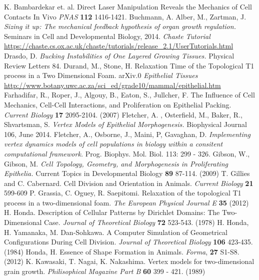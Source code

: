 \begin{thebibliography}{1}
 K. Bambardekar et. al. Direct Laser Manipulation Reveals the Mechanics of Cell Contacts In Vivo \emph{PNAS} \textbf{112} 1416-1421.
 Buchmann, A. Alber, M., Zartman, J. \emph{ Sizing it up: The mechanical feedback hypothesis of organ growth regulation.} Seminars in Cell and Developmental Biology, 2014.
 \emph{Chaste Tutorial} \url{https://chaste.cs.ox.ac.uk/chaste/tutorials/release_2.1/UserTutorials.html}
 Drasdo, D. \emph{Bucking Instabilities of One Layered Growing Tissues.} Physical Review Letters 84.
 Durand, M., Stone, H. Relaxation Time of the Topological T1 process in a Two Dimensional Foam. arXiv.0
\emph{Epithelial Tissues} \url{http://www.botany.uwc.ac.za/sci_ed/grade10/mammal/epithelial.htm}
 Farhadifar, R., Roper, J., Algouy, B., Eaton, S., Jullcher, F. The Influence of Cell Mechanics, Cell-Cell Interactions, and Proliferation on Epithelial Packing. \emph{Current Biology} \textbf{17} 2095-2104. (2007) 
 Fletcher, A. , Osterfield, M., Baker, R., Shvartsman, S. \emph{Vertex Models of Epithelial Morphogenesis.} Biophysical Journal 106, June 2014.
 Fletcher, A., Osborne, J., Maini, P, Gavaghan, D. \emph{Implementing vertex dynamics models of cell populations in biology within a consitent computational framework.} Prog. Biophys. Mol. Biol. 113: 299 - 326.
 Gibson, W., Gibson, M. \emph{Cell Topology, Geometry, and Morphogenesis  in Proliferating Epithelia.} Current Topics in Developmental Biology \textbf{89} 87-114. (2009)
 T. Gillies and C. Cabernard. Cell Division and Orientation in Animals. \emph{Current Biology} \textbf{21} 599-609
 P. Grassia, C. Oguey, R. Saepitomi. Relaxation of the topological T1 process in a two-dimensional foam. \emph{The European Physical Journal E} \textbf{35} (2012)
 H. Honda. Description of Cellular Patterns by Dirichlet Domains: The Two-Dimensional Case. \emph{Journal of Theoretical Biology} \textbf{72} 523-543. (1978)
 H. Honda, H. Yamanaka, M. Dan-Sohkawa. A Computer Simulation of Geometrical Configurations During Cell Division. \emph{Journal of Theoretical Biology} \textbf{106} 423-435. (1984)
 Honda, H. Essence of Shape Formation in Animals. \emph{Forma}, \textbf{27} S1-S8. (2012)
 K. Kawasaki, T. Nagai, K. Nakashima. Vertex models for two-dimensional grain growth. \emph{Philisophical Magazine Part B} \textbf{60} 399 - 421. (1989)

\end{thebibliography}
